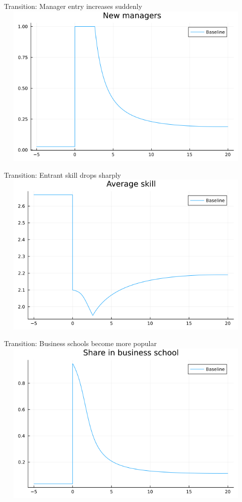 \documentclass[
  ignorenonframetext,
  aspectratio=1610,
]{beamer}
\begin{document}
\begin{frame}{Transition: Manager entry increases suddenly}
\protect\hypertarget{transition-manager-entry-increases-suddenly}{}
\includegraphics[width=13cm,height=8cm]{fig/model-entry-liberalization.png}
\end{frame}

\begin{frame}{Transition: Entrant skill drops sharply}
\protect\hypertarget{transition-entrant-skill-drops-sharply}{}
\includegraphics[width=13cm,height=8cm]{fig/model-skill-liberalization.png}
\end{frame}

\begin{frame}{Transition: Business schools become more popular}
\protect\hypertarget{transition-business-schools-become-more-popular}{}
\includegraphics[width=13cm,height=8cm]{fig/model-econ-liberalization.png}
\end{frame}
\end{document}
